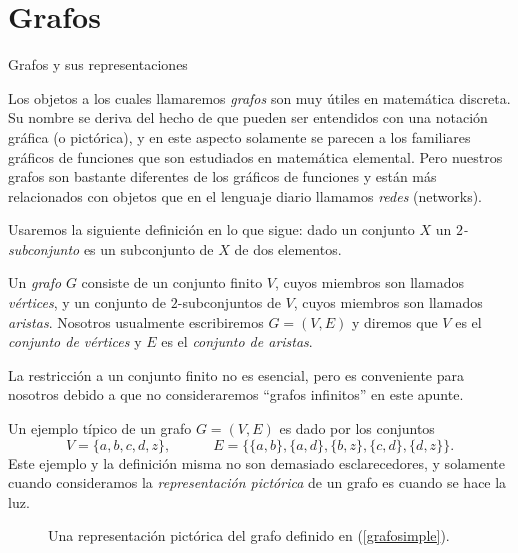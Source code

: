 \chapter[Grafos]{Grafos}\label{cap.grafos}

\begin{section}{Grafos y sus representaciones}\label{seccion-grafos}

Los objetos a los cuales llamaremos \textit{grafos} son muy útiles en matemática discreta. Su nombre se deriva del hecho de que pueden ser entendidos con una notación gráfica (o pictórica), y en este aspecto solamente se parecen a los familiares gráficos de funciones que son estudiados en matemática elemental. Pero
nuestros grafos son bastante diferentes de los gráficos de funciones y están más relacionados con objetos que en el lenguaje diario llamamos \textit{redes} (networks).  

Usaremos la siguiente definición en lo que sigue: dado un conjunto $X$ un \textit{$2$-subconjunto} es un subconjunto de $X$ de dos elementos.  

\begin{definicion} Un \textit{grafo} $G$ consiste de un   conjunto finito $V$, cuyos miembros son llamados  \textit{vértices},   y un conjunto de $2$-subconjuntos de $V$, cuyos miembros son llamados \textit{aristas}.   Nosotros usualmente escribiremos $G=(V,E)$ y diremos que $V$ es el \textit{conjunto de vértices} y $E$ es el \textit{conjunto de aristas}.
\end{definicion}

La restricción a un conjunto finito no es esencial, pero es conveniente para nosotros debido a que no consideraremos ``grafos infinitos'' en este apunte.

Un ejemplo típico de un grafo $G=(V,E)$ es dado por los conjuntos
\begin{equation}\label{grafosimple}
V=\{a,b,c,d,z\}, \qquad\quad
E=\{\{a,b\},\{a,d\},\{b,z\},\{c,d\},\{d,z\}\}.
\end{equation}
Este ejemplo y la definición misma no son demasiado esclarecedores, y solamente cuando con\-si\-de\-ra\-mos la \textit{representación pictórica} de un grafo es cuando se hace la luz. 

\begin{figure}[ht]
    \begin{center}
    \end{center}    
    \caption{Una representación pictórica del grafo definido en (\ref{grafosimple}).}\label{f5.1}
\end{figure}


\end{section}
